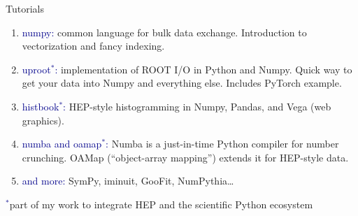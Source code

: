 \documentclass[aspectratio=169]{beamer}
\begin{document}
\begin{frame}{Tutorials}
\vspace{0.25 cm}
\begin{enumerate}\setlength{\itemsep}{0.35 cm}
\item \textcolor{darkblue}{numpy:} common language for bulk data exchange. Introduction to vectorization and fancy indexing.

\item \textcolor{darkblue}{uproot$^*$:} implementation of ROOT I/O in Python and Numpy. Quick way to get your data into Numpy and everything else. Includes PyTorch example.

\item \textcolor{darkblue}{histbook$^*$:} HEP-style histogramming in Numpy, Pandas, and Vega (web graphics).

\item \textcolor{darkblue}{numba and oamap$^*$:} Numba is a just-in-time Python compiler for number crunching. OAMap (``object-array mapping'') extends it for HEP-style data.

\item \textcolor{darkblue}{and more:} SymPy, iminuit, GooFit, NumPythia\ldots
\end{enumerate}

\vspace{0.5 cm}
\textcolor{darkblue}{$^*$}\small part of my work to integrate HEP and the scientific Python ecosystem
\end{frame}







\end{document}
